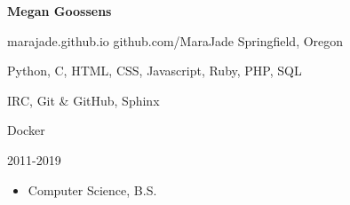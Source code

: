 \documentclass[11pt]{article} %
\begin{document}
\centerline{{\Huge \bf Megan Goossens}}
\bigskip


        {marajade.github.io}
        {github.com/MaraJade}
        {Springfield, Oregon}



      {Python, C, HTML, CSS, Javascript, Ruby, PHP, SQL}

      {IRC, Git \& GitHub, Sphinx}

      {Docker}


\begin{description}
\squish

           {}
           {2011-2019}

\begin{itemize}
  \item Computer Science, B.S.
\end{itemize}

\end{description}

\end{document}
